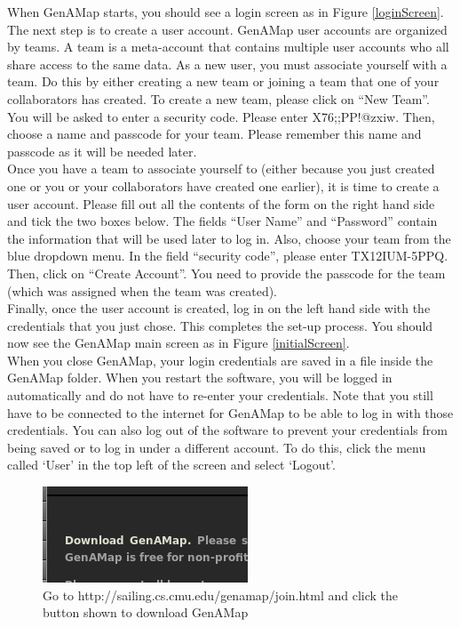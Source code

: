 \documentclass{article}
\begin{document}
When GenAMap starts, you should see a login screen as in Figure \ref{loginScreen}. The next step is to create a user account. GenAMap user accounts are organized by teams. A team is a meta-account that contains multiple user accounts who all share access to the same data. As a new user, you must associate yourself with a team. Do this by either creating a new team or joining a team that one of your collaborators has created. To create a new team, please click on ``New Team''. You will be asked to enter a security code. Please enter X76;;PP!@zxiw. Then, choose a name and passcode for your team. Please remember this name and passcode as it will be needed later.\\

Once you have a team to associate yourself to (either because you just created one or you or your collaborators have created one earlier), it is time to create a user account. Please fill out all the contents of the form on the right hand side and tick the two boxes below. The fields ``User Name'' and ``Password'' contain the information that will be used later to log in. Also, choose your team from the blue dropdown menu. In the field ``security code'', please enter TX12IUM-5PPQ. Then, click on ``Create Account''. You need to provide the passcode for the team (which was assigned when the team was created).\\

Finally, once the user account is created, log in on the left hand side with the credentials that you just chose. This completes the set-up process. You should now see the GenAMap main screen as in Figure \ref{initialScreen}.\\

When you close GenAMap, your login credentials are saved in a file inside the GenAMap folder. When you restart the software, you will be logged in automatically and do not have to re-enter your credentials. Note that you still have to be connected to the internet for GenAMap to be able to log in with those credentials. You can also log out of the software to prevent your credentials from being saved or to log in under a different account. To do this, click the menu called `User' in the top left of the screen and select `Logout'.\\

\pagebreak
\clearpage

\begin{figure}
\includegraphics[width=\textwidth]{downloadButton.png}
\caption{Go to http://sailing.cs.cmu.edu/genamap/join.html and click the button shown to download GenAMap}
\label{downloadButton}
\end{figure}
\end{document}
